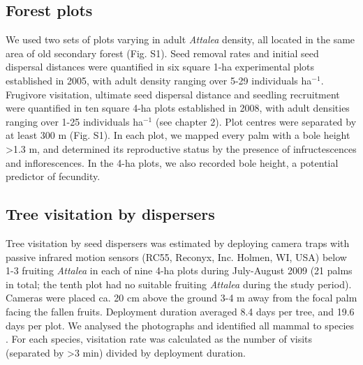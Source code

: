 \documentclass[b5paper,justified]{tufte-book} %
\begin{document}
\begin{fullwidth}
\subsection{Forest plots}
We used two sets of plots varying in adult \textit{Attalea} density, all located in the same area of old secondary forest (Fig. S1). Seed removal rates and initial seed dispersal distances were quantified in six square 1-ha experimental plots established in 2005, with adult density ranging over 5-29 individuals ha$^{-1}$. Frugivore visitation, ultimate seed dispersal distance and seedling recruitment were quantified in ten square 4-ha plots established in 2008, with adult densities ranging over 1-25 individuals ha$^{-1}$ (see chapter 2). Plot centres were separated by at least 300 m (Fig. S1). In each plot, we mapped every palm with a bole height >1.3 m, and determined its reproductive status by the presence of infructescences and inflorescences. In the 4-ha plots, we also recorded bole height, a potential predictor of fecundity. 

\subsection{Tree visitation by dispersers}
Tree visitation by seed dispersers was estimated by deploying camera traps with passive infrared motion sensors (RC55, Reconyx, Inc. Holmen, WI, USA) below 1-3 fruiting \textit{Attalea} in each of nine 4-ha plots during July-August 2009 (21 palms in total; the tenth plot had no suitable fruiting \textit{Attalea} during the study period). Cameras were placed ca. 20 cm above the ground 3-4 m away from the focal palm facing the fallen fruits. Deployment duration averaged 8.4 days per tree, and 19.6 days per plot. We analysed the photographs and identified all mammal to species \citep{Kays2011}. For each species, visitation rate was calculated as the number of visits (separated by >3 min) divided by deployment duration.


\end{fullwidth}
\end{document}

